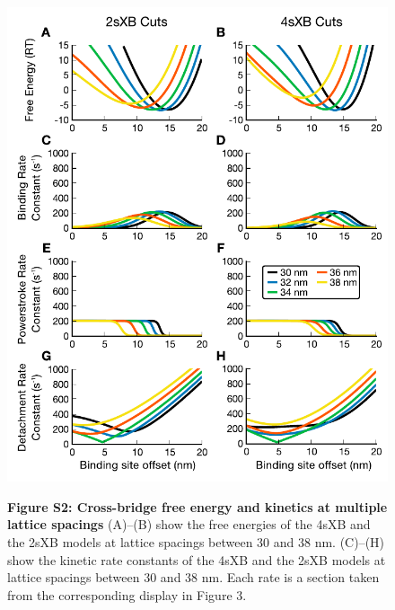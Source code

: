 \documentclass[10pt]{article}
\date{} %
\begin{document}
\begin{figure}[!ht]
    \begin{center}
    \includegraphics[height=.8\textheight]{./fig_multiple_kinetics_cuts.pdf}
    \parbox{\textwidth}{
        \vspace{1em}
        \textbf{Figure S2: Cross-bridge free energy and kinetics at multiple lattice spacings}
        (A)--(B) show the free energies of the 4sXB and the 2sXB models at lattice spacings between 30 and 38 nm. 
        (C)--(H) show the kinetic rate constants of the 4sXB and the 2sXB models at lattice spacings between 30 and 38 nm.
        Each rate is a section taken from the corresponding display in Figure 3. %
        \label{fig_multiple_kinetics_cuts}
        }
    \end{center}
\end{figure}
\end{document}
